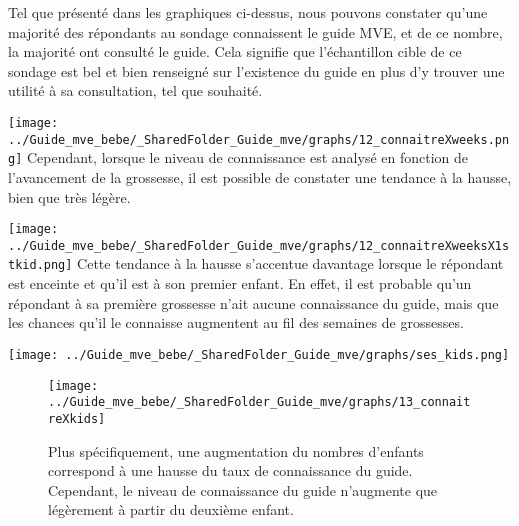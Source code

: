 \documentclass[
]{article}
\begin{document}
\begin{minipage}{1.0\textwidth}
  \textbf{} 
Tel que présenté dans les graphiques ci-dessus, nous pouvons constater qu’une majorité des répondants au sondage connaissent le guide MVE, et de ce nombre, la majorité ont consulté le guide. Cela signifie que l’échantillon cible de ce sondage est bel et bien renseigné sur l’existence du guide en plus d'y trouver une utilité à sa consultation, tel que souhaité.

\end{minipage}

\vspace{30pt}

\texttt{[image: ../Guide\_mve\_bebe/\_SharedFolder\_Guide\_mve/graphs/12\_connaitreXweeks.png]}
\vspace{20pt} \newline Cependant, lorsque le niveau de connaissance est
analysé en fonction de l'avancement de la grossesse, il est possible de
constater une tendance à la hausse, bien que très légère.

\texttt{[image: ../Guide\_mve\_bebe/\_SharedFolder\_Guide\_mve/graphs/12\_connaitreXweeksX1stkid.png]}
\vspace{20pt} \newline Cette tendance à la hausse s'accentue davantage
lorsque le répondant est enceinte et qu'il est à son premier enfant. En
effet, il est probable qu'un répondant à sa première grossesse n'ait
aucune connaissance du guide, mais que les chances qu'il le connaisse
augmentent au fil des semaines de grossesses.

\texttt{[image: ../Guide\_mve\_bebe/\_SharedFolder\_Guide\_mve/graphs/ses\_kids.png]}

\begin{figure}[htbp]
  \centering
  \begin{minipage}{0.7\textwidth}
    \texttt{[image: ../Guide\_mve\_bebe/\_SharedFolder\_Guide\_mve/graphs/13\_connaitreXkids]}
  \end{minipage}%
  \begin{minipage}{0.3\textwidth}
    \textbf{}
    Plus spécifiquement, une augmentation du  nombres d'enfants correspond à une hausse du taux de connaissance du guide. Cependant, le niveau de connaissance du guide n'augmente que légèrement à partir du deuxième enfant.
  \end{minipage}
\end{figure}
\end{document}
